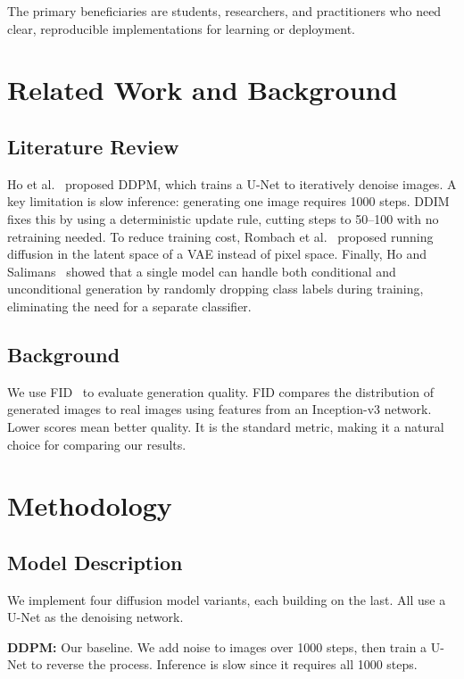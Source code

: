 \documentclass{article}
\begin{document}
The primary beneficiaries are students, researchers, and practitioners who need clear, reproducible implementations for learning or deployment.

\section{Related Work and Background}

\subsection{Literature Review}

Ho et al.~\cite{ho2020denoising} proposed DDPM, which trains a U-Net to
iteratively denoise images. A key limitation is slow inference: generating one
image requires 1000 steps. DDIM~\cite{song2020denoising} fixes this by using a
deterministic update rule, cutting steps to 50--100 with no retraining needed.
To reduce training cost, Rombach et al.~\cite{rombach2022highresolution}
proposed running diffusion in the latent space of a VAE instead of pixel space.
Finally, Ho and Salimans~\cite{ho2022classifierfree} showed that a single model
can handle both conditional and unconditional generation by randomly dropping
class labels during training, eliminating the need for a separate classifier.

\subsection{Background}

We use FID~\cite{heusel2017gans} to evaluate generation quality. FID compares
the distribution of generated images to real images using features from an
Inception-v3 network. Lower scores mean better quality. It is the standard
metric, making it a natural choice for comparing our results.

\section{Methodology}

\subsection{Model Description}

We implement four diffusion model variants, each building on the last.
All use a U-Net as the denoising network.

\textbf{DDPM:} Our baseline. We add noise to images over 1000 steps,
then train a U-Net to reverse the process. Inference is slow since it
requires all 1000 steps.
\end{document}
